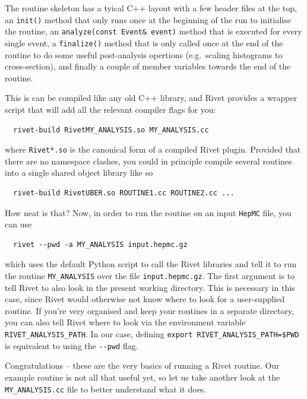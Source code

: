\documentclass[10pt,fleqn]{scrartcl}
\theoremstyle{exstyle}
\begin{document}
The routine skeleton has a tyical C++ layout with a few header files at the top,
an \verb|init()| method that only runs once at the beginning of the run %
to initialise the routine, an \verb|analyze(const Event& event)| method that is executed for every
single event, a \verb|finalize()| method that is only called once at the end of the routine
to do some useful post-analysis opertions (e.g.\ scaling histograms to cross-section),
and finally a couple of member variables towards the end of the routine.

This is can be compiled like any old C++ library, and Rivet provides a wrapper script
that will add all the relevant compiler flags for you:
\begin{verbatim}
  rivet-build RivetMY_ANALYSIS.so MY_ANALYSIS.cc
\end{verbatim}
where \verb|Rivet*.so| is the canonical form of a compiled Rivet plugin.
Provided that there are no namespace clashes, you could in principle
compile several routines into a single shared object library like so
\begin{verbatim}
  rivet-build RivetUBER.so ROUTINE1.cc ROUTINE2.cc ...
\end{verbatim}
How neat is that? Now, in order to run the routine on an input \texttt{HepMC} file,
you can use
\begin{verbatim}
  rivet --pwd -a MY_ANALYSIS input.hepmc.gz
\end{verbatim}
which uses the default Python script to call the Rivet libraries and tell it to run
the routine \verb|MY_ANALYSIS| over the file \verb|input.hepmc.gz|. The first argument
is to tell Rivet to also look in the present working directory.
This is necessary in this case, since Rivet would otherwise not know where to look
for a user-supplied routine. If you're very organised and keep your routines
in a separate directory, you can also tell Rivet where to look via the environment
variable \verb|RIVET_ANALYSIS_PATH|. In our case, defining
\verb|export RIVET_ANALYSIS_PATH=$PWD| is equivalent to using the \verb|--pwd| flag.

Congratulations -- these are the very basics of running a Rivet routine.
Our example routine is not all that useful yet, so let us take another
look at the \verb|MY_ANALYSIS.cc| file to better understand what it does.
\end{document}
